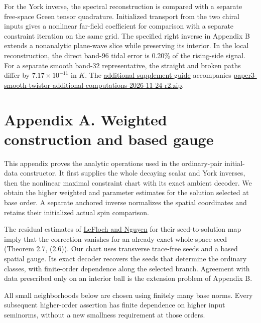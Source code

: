\documentclass[
  english,
  11pt,
  reqno]{amsart}
\begin{document}
For the York inverse, the spectral reconstruction is compared with a
separate free-space Green tensor quadrature. Initialized transport from
the two chiral inputs gives a nonlinear far-field coefficient for
comparison with a separate constraint iteration on the same grid. The
specified right inverse in Appendix B extends a nonanalytic plane-wave
slice while preserving its interior. In the local reconstruction, the
direct band-96 tidal error is 0.20\% of the rising-side signal. For a
separate smooth band-32 representative, the straight and broken paths
differ by \(7.17\times10^{-11}\) in \(K\). The
\href{../additional-computations/paper3-smooth-twistor-additional-computations-2026-11-24-r2/README.md}{additional
supplement guide} accompanies
\href{https://github.com/lioristhmus/smooth-twistor-germs/releases/download/v1.1/paper3-smooth-twistor-additional-computations-2026-11-24-r2.zip}{paper3-smooth-twistor-additional-computations-2026-11-24-r2.zip}.

\label{app:online-weighted-construction}

\section{Appendix A. Weighted construction and based
gauge}\label{appendix-a.-weighted-construction-and-based-gauge}

This appendix proves the analytic operations used in the ordinary-pair
initial-data constructor. It first supplies the whole decaying scalar
and York inverses, then the nonlinear maximal constraint chart with its
exact ambient decoder. We obtain the higher weighted and parameter
estimates for the solution selected at base order. A separate anchored
inverse normalizes the spatial coordinates and retains their initialized
actual spin comparison.

The residual estimates of \hyperref[ref-LeFlochNguyen2023]{LeFloch and
Nguyen} for their seed-to-solution map imply that the correction
vanishes for an already exact whole-space seed (Theorem 2.7, (2.6)). Our
chart uses transverse trace-free seeds and a based spatial gauge. Its
exact decoder recovers the seeds that determine the ordinary classes,
with finite-order dependence along the selected branch. Agreement with
data prescribed only on an interior ball is the extension problem of
Appendix B.

All small neighborhoods below are chosen using finitely many base norms.
Every subsequent higher-order assertion has finite dependence on higher
input seminorms, without a new smallness requirement at those orders.
\end{document}

